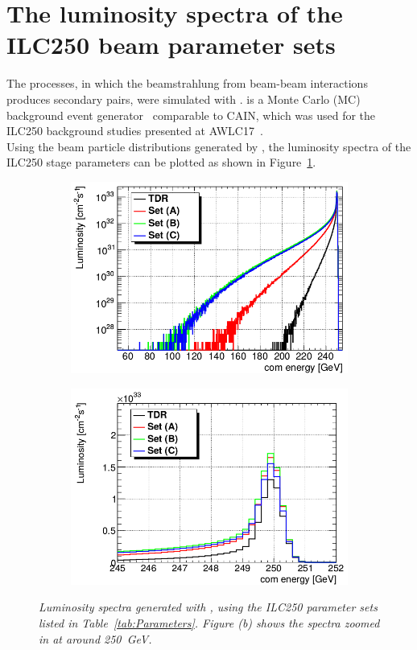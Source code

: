 \newpage
\section{The luminosity spectra of the ILC250 beam parameter sets}
\label{sec:Envelopes}
The processes, in which the beamstrahlung from beam-beam interactions produces secondary \Pep \Pem pairs, were simulated with \guineapig.
\guineapig is a Monte Carlo (MC) background event generator~\cite{Schulte:1997nga} comparable to CAIN, which was used for the ILC250 background studies presented at AWLC17~\cite{AWLC_Jeans}.\\
Using the beam particle distributions generated by \guineapig, the luminosity spectra of the ILC250 stage parameters can be plotted as shown in Figure~\ref{fig:Lumi_Spectra}.
\begin{figure}[h]
\centering
\begin{subfigure}[t]{0.49\textwidth}
\centering
\includegraphics[width=\textwidth]{figures/Lumi_Spectrum.png}
\caption{}
\end{subfigure}
\hspace*{0.08cm}
\begin{subfigure}[t]{0.49\textwidth}
\centering
\includegraphics[width=\textwidth]{figures/Lumi_Spectrum_zoom.png}
\caption{}
\end{subfigure}
\caption{\textit{Luminosity spectra generated with \guineapig, using the ILC250 parameter sets listed in Table~\ref{tab:Parameters}.
Figure (b) shows the spectra zoomed in at around \SI{250}{\GeV}.}}
\label{fig:Lumi_Spectra}
\end{figure}
